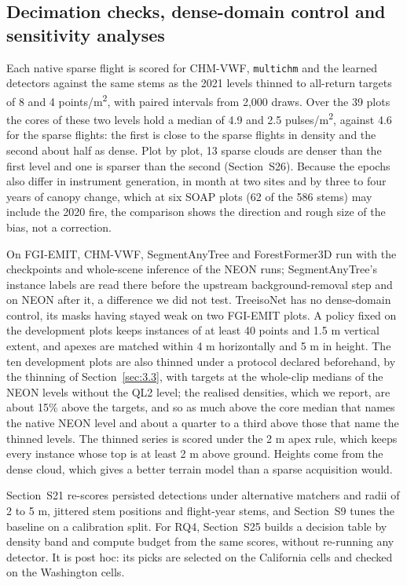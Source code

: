 \documentclass[preprint,12pt,authoryear,a4paper]{elsarticle}
\begin{document}
\subsection{Decimation checks, dense-domain control and sensitivity analyses}\label{sec:4.6}

Each native sparse flight is scored for CHM-VWF, \texttt{multichm} and the learned
detectors against the same stems as the 2021 levels thinned to all-return
targets of 8 and 4 points/m\textsuperscript{2}, with paired intervals from 2,000 draws. Over the
39 plots the cores of these two levels hold a median of 4.9 and 2.5 pulses/m\textsuperscript{2},
against 4.6 for the sparse flights: the first is close to the sparse flights in
density and the second about half as dense. Plot by plot, 13 sparse clouds are
denser than the first level and one is sparser than the second (Section~S26).
Because the epochs also differ in instrument generation, in month at two sites
and by three to four years of canopy change, which at six SOAP plots (62 of the
586 stems) may include the 2020 fire, the comparison shows the direction and
rough size of the bias, not a correction.

On FGI-EMIT, CHM-VWF, SegmentAnyTree and ForestFormer3D run with the checkpoints
and whole-scene inference of the NEON runs; SegmentAnyTree's instance labels are
read there before the upstream background-removal step and on NEON after it, a
difference we did not test. TreeisoNet has no dense-domain control, its masks
having stayed weak on two FGI-EMIT plots. A policy fixed on the development
plots keeps instances of at least 40 points and 1.5 m vertical extent, and
apexes are matched within 4 m horizontally and 5 m in height. The ten
development plots are also thinned under a protocol declared beforehand, by the
thinning of Section~\ref{sec:3.3}, with targets at the whole-clip medians of the NEON
levels without the QL2 level; the realised densities, which we report, are about
15\% above the targets, and so as much above the core median that names the
native NEON level and about a quarter to a third above those that name the
thinned levels. The thinned series is scored under the 2 m apex rule, which
keeps every instance whose top is at least 2 m above ground. Heights come
from the dense cloud, which gives a better terrain model than a sparse
acquisition would.

Section~S21 re-scores persisted detections under alternative matchers and radii
of 2 to 5 m, jittered stem positions and flight-year stems, and Section~S9 tunes
the baseline on a calibration split. For RQ4, Section~S25 builds a decision
table by density band and compute budget from the same scores, without
re-running any detector. It is post hoc: its picks are selected on the
California cells and checked on the Washington cells.
\end{document}
